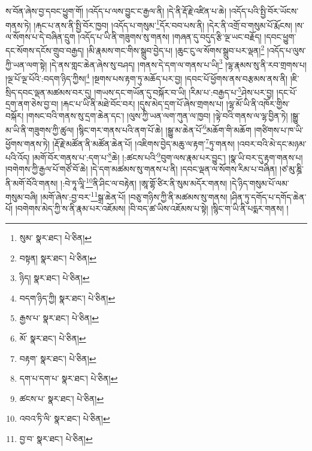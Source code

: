 ས་བོན་ཞེས་བྱ་དབང་ཕྱུག་གོ། །འདོད་པ་ལས་བྱུང་ང་རྒྱལ་ནི། །དེ་ནི་རྡོ་རྗེ་འཛིན་པ་ཆེ། །འདོད་པའི་སྤྱི་བོར་ཡོངས་གནས་ཏེ། །རྐང་པ་ནས་ནི་སྤྱི་བོར་ཁྱབ། །འདོད་པ་གསུམ་\footnote{སུམ་  སྣར་ཐང་།  པེ་ཅིན། }དོར་བབ་པས་ནི། །དེར་ནི་འགྲོ་བ་གསུམ་པོ་རྨོངས། །ས་ལ་སོགས་པ་དེ་བཞིན་དྲུག །འདོད་པ་ཡི་ནི་གཟུགས་སུ་གནས། །གཞན་དུ་བདུད་རྩི་ལྔ་ཡང་བརྗོད། །དབང་ཕྱུག་དང་སོགས་དངོས་གྲུབ་བརྒྱད། །མི་རྣམས་གང་གིས་སྒྲུབ་བྱེད་པ། །ཆུང་ངུ་ལ་སོགས་སྒྲུབ་པར་ལྡན།\footnote{བསྟན།  སྣར་ཐང་།  པེ་ཅིན། } །འདོད་པ་ལུས་ཀྱི་ཡན་ལག་སྟེ། །དེ་ནས་གླང་ཆེན་ཞེས་སུ་བཤད། །གནས་དེ་དག་ལ་གནས་པ་ཡི།\footnote{ཉིད།  སྣར་ཐང་།  པེ་ཅིན། } །ལྷ་རྣམས་སུ་ནི་རབ་གྲགས་པ། །ལྔ་པོ་ལྔ་པོའི་:བདག་ཉིད་ཀྱིས།\footnote{བདག་ཉིད་ཀྱི།  སྣར་ཐང་།  པེ་ཅིན། } །སྔགས་པས་རྟག་ཏུ་མཆོད་པར་བྱ། །དབང་པོ་ཕྱོགས་ནས་བརྩམས་ནས་ནི། །ཇི་སྲིད་དབང་ལྡན་མཚམས་བར་དུ། །གཡས་དང་གཡོན་དུ་བསྐོར་བ་ཡི། །རིམ་པ་:བརྒྱད་པ་\footnote{རྒྱས་པ་  སྣར་ཐང་།  པེ་ཅིན། }ཤེས་པར་བྱ། །དང་པོ་དྲག་ནག་ཅེས་བྱ་བ། །རྐང་པ་ཡི་ནི་མཐེ་བོང་བར། །དུས་མེད་དྲག་པོ་ཞེས་གྲགས་པ། །ལྷ་མོ་ཡི་ནི་འཁོར་གྱིས་བསྐོར། །གསང་བའི་གནས་སུ་དྲག་ཆེན་དང་། །ལུས་ཀྱི་ཡན་ལག་ཀུན་ལ་ཁྱབ། །ལྟེ་བའི་གནས་ལ་ལྷ་བྱིན་ཏེ། །སྒྱུ་མ་ཡི་ནི་གཟུགས་ཀྱི་ཚུལ། །སྙིང་གར་གནས་པའི་ནག་པོ་ཆེ། །སྒྱུ་མ་ཆེན་པོ་\footnote{མོ་  སྣར་ཐང་།  པེ་ཅིན། }མཆོག་གི་མཆོག །གཙིགས་པ་ཁ་ཡི་ཕྱོགས་གནས་ཏེ། །རྡོ་རྗེ་མཚོན་ནི་མཚོན་ཆེན་པོ། །འཇིགས་བྱེད་མཆུ་ལ་རྟག་\footnote{བརྟག་  སྣར་ཐང་།  པེ་ཅིན། }ཏུ་གནས། །འབར་བའི་མེ་དང་མཉམ་པའི་འོད། །མགོ་བོར་གནས་པ་:དག་པ་\footnote{དག་པ་དག་པ་  སྣར་ཐང་།  པེ་ཅིན། }ཆེ། །:ཚངས་པའི་\footnote{ཚངས་པ་  སྣར་ཐང་།  པེ་ཅིན། }བུག་ལས་རྣམ་པར་བྱུང་། །སྣ་ཡི་བར་དུ་རྟག་གནས་པ། །བགེགས་ཀྱི་རྒྱལ་པོ་གཙོ་བོ་ཆེ། །དེ་དག་མཚམས་སུ་གནས་པ་ནི། །དབང་ལྡན་ལ་སོགས་རིམ་པ་བཞིན། །ཙ་མུ་ཎྜི་ནི་མགོ་བོའི་གནས། །:བེ་ཏཱ་ལཱི་\footnote{འབའ་ཏི་ལི་  སྣར་ཐང་།  པེ་ཅིན། }ནི་ཤིང་ལ་བརྟེན། །ཨཱ་གྷོ་ཙིར་ནི་སུམ་མདོར་གནས། །དེ་ཉིད་གསུམ་པོ་ལམ་གསུམ་བཞི། །མགོ་ཞེས་:བྱ་བར་\footnote{བྱ་བ་  སྣར་ཐང་།  པེ་ཅིན། }སྒྲ་ཆེན་པོ། །བཅུ་གཉིས་ཀྱི་ནི་མཚམས་སུ་གནས། །ཤིན་ཏུ་དགོད་པ་དགོད་ཆེན་པོ། །བགེགས་མེད་ཀྱི་ས་ནི་རྣམ་པར་འཇོམས། །བི་བད་ཚ་ཡིས་འཇོམས་པ་སྟེ། །སྙིང་ག་ཡི་ནི་པདྨར་གནས། །
